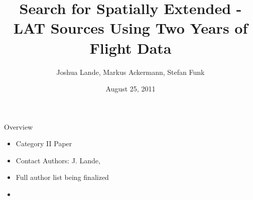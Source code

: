 \documentclass[12pt]{beamer}
\title{Search for Spatially Extended \fermi-LAT Sources Using Two Years of Flight
Data}
\author{Joshua Lande, Markus Ackermann, Stefan Funk}
\institute{SLAC/Stanford}
\date{August 25, 2011}
\begin{document}
\fermititle



\begin{frame}{Overview}
  \begin{itemize}
    \item Category II Paper
    \item Contact Authors: J. Lande, 
    \item Full author list being finalized
    \item 
  \end{itemize}
\end{frame}
\end{document}
